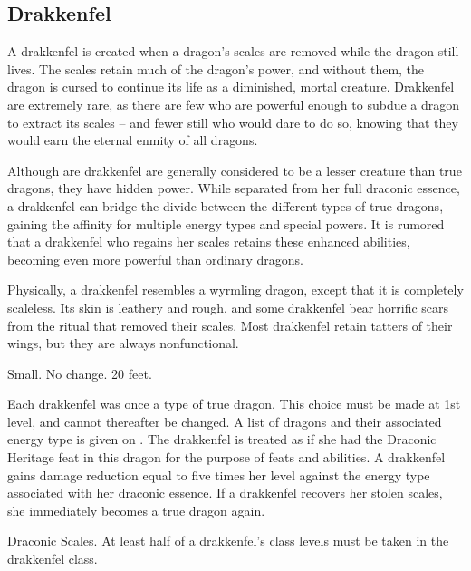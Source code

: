     \subsection{Drakkenfel}

        A drakkenfel is created when a dragon's scales are removed while the dragon still lives. The scales retain much of the dragon's power, and without them, the dragon is cursed to continue its life as a diminished, mortal creature. Drakkenfel are extremely rare, as there are few who are powerful enough to subdue a dragon to extract its scales -- and fewer still who would dare to do so, knowing that they would earn the eternal enmity of all dragons.

        Although are drakkenfel are generally considered to be a lesser creature than true dragons, they have hidden power. While separated from her full draconic essence, a drakkenfel can bridge the divide between the different types of true dragons, gaining the affinity for multiple energy types and special powers. It is rumored that a drakkenfel who regains her scales retains these enhanced abilities, becoming even more powerful than ordinary dragons.

        Physically, a drakkenfel resembles a wyrmling dragon, except that it is completely scaleless. Its skin is leathery and rough, and some drakkenfel bear horrific scars from the ritual that removed their scales. Most drakkenfel retain tatters of their wings, but they are always nonfunctional.

         Small.
         No change.
         20 feet.
        \begin{itemize}
             Each drakkenfel was once a type of true dragon. This choice must be made at 1st level, and cannot thereafter be changed. A list of dragons and their associated energy type is given on . The drakkenfel is treated as if she had the Draconic Heritage feat in this dragon for the purpose of feats and abilities.
             A drakkenfel gains damage reduction equal to five times her level against the energy type associated with her draconic essence.
             If a drakkenfel recovers her stolen scales, she immediately becomes a true dragon again.
        \end{itemize}
         Draconic Scales.
         At least half of a drakkenfel's class levels must be taken in the drakkenfel class.

